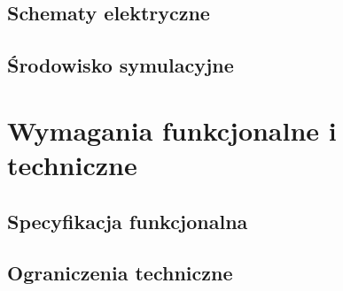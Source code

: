     \subsection{Schematy elektryczne}
        \noindent \lipsum[2]
        
    \subsection{Środowisko symulacyjne}
        \noindent \lipsum[2]


\clearpage\section{Wymagania funkcjonalne i techniczne}
    \noindent \lipsum[2]

    \subsection{Specyfikacja funkcjonalna}
        \noindent \lipsum[2]

    \subsection{Ograniczenia techniczne}
        \noindent \lipsum[2]